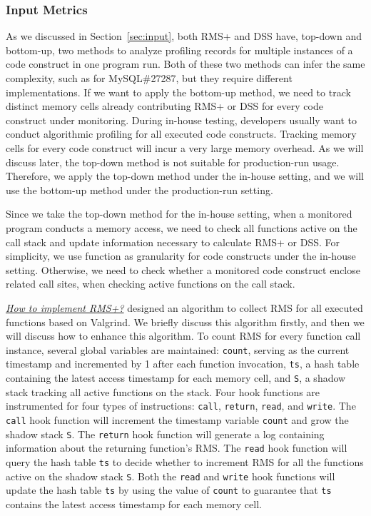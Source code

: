 \subsubsection{Input Metrics}
As we discussed in Section~\ref{sec:input},
both RMS+ and DSS have, top-down and bottom-up, 
two methods to analyze profiling records for multiple instances of 
a code construct in one program run. 
Both of these two methods can infer the same complexity, 
such as for MySQL\#27287,
but they require different implementations.
If we want to apply the bottom-up method,
we need to track distinct memory cells already contributing 
RMS+ or DSS for every code construct under monitoring.
During in-house testing, developers usually want to conduct algorithmic profiling 
for all executed code constructs. 
Tracking memory cells for every code construct will 
incur a very large memory overhead.  
As we will discuss later, the top-down method 
is not suitable for production-run usage. 
Therefore, we apply the top-down method under the in-house setting, 
and we will use the bottom-up method under the production-run setting. 

Since we take the top-down method for the in-house setting,
when a monitored program conducts a memory access,
we need to check all functions active on the call stack and 
update information necessary to calculate RMS+ or DSS. 
For simplicity, we use function as granularity for code constructs under the in-house setting.
Otherwise, we need to check whether a monitored code construct enclose related call sites, 
when checking active functions on the call stack.  

{\textit{\underline{How to implement RMS+?}}}
\citet{Aprof1,Aprof2} designed an algorithm to collect 
RMS for all executed functions based on 
Valgrind. We briefly discuss this algorithm firstly, 
and then we will discuss how to enhance this algorithm. 
To count RMS for every function call instance, 
several global variables are maintained: 
\texttt{count}, serving as the current timestamp and incremented 
by 1 after each function invocation,  
\texttt{ts}, a hash table containing the latest access timestamp for each memory cell, 
and \texttt{S}, a shadow stack tracking all active functions on the stack. 
Four hook functions are instrumented for four types of instructions:
\texttt{call}, \texttt{return}, \texttt{read}, and \texttt{write}.
The \texttt{call} hook function will increment the timestamp variable \texttt{count} 
and grow the shadow stack \texttt{S}.
The \texttt{return} hook function will generate a 
log containing information about the returning function's RMS.
The \texttt{read} hook function will query the hash table \texttt{ts} to decide whether 
to increment RMS for all the functions active on the shadow stack \texttt{S}.
Both the \texttt{read} and \texttt{write} hook 
functions will update the hash table \texttt{ts}
by using the value of \texttt{count} to guarantee that \texttt{ts} 
contains the latest access timestamp for each memory cell. 


